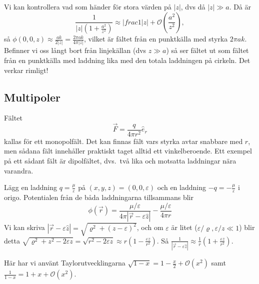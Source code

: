 \documentclass[%
oneside,                 %
final,                   %
10pt]{article}
\newenvironment{notice_mdfboxadmon}[1][]{
\begin{notice_mdfboxmdframed}[frametitle=#1]
}
{
\end{notice_mdfboxmdframed}
}
\newenvironment{warning_mdfboxadmon}[1][]{
\begin{warning_mdfboxmdframed}[frametitle=#1]
}
{
\end{warning_mdfboxmdframed}
}
\begin{document}
\begin{notice_mdfboxadmon}
Vi kan kontrollera vad som händer för stora värden på $|z|$, dvs då $|z| \gg a$. Då är 
\begin{equation}
\frac{1}{|z| \left( 1+\frac{a^2}{z^2} \right)} \approx |frac{1}{|z|} + \mathcal{O}\left(\frac{a^2}{z^2}\right),
\end{equation}
så $\phi(0,0,z)\approx \frac{a k}{2|z|} = \frac{2 \pi a k}{4\pi|z|}$, vilket är fältet från en punktkälla med styrka $2\pi a k$. Befinner vi oss långt bort från linjekällan (dvs $z \gg a$) så ser fältet ut som fältet från en punktkälla med laddning lika med den totala laddningen på cirkeln. Det verkar rimligt!
\end{notice_mdfboxadmon} %



\subsection*{Multipoler}

Fältet
\begin{equation}
  \vec{F} = \frac{q}{4 \pi r^2} \hat{e}_{r}
\end{equation}
kallas för ett monopolfält.  Det kan finnas fält vars styrka avtar snabbare med $r$, men sådana fält innehåller praktiskt taget alltid ett vinkelberoende. Ett exempel på ett sådant fält är dipolfältet, dvs.~två lika och motsatta laddningar nära varandra. 

Lägg en laddning $q = \frac{\mu}{\varepsilon}$ på $(x,y,z)=(0,0,\varepsilon)$ och en laddning
$-q = -\frac{\mu}{\varepsilon}$ i origo. Potentialen från de båda laddningarna tillsammans blir
\begin{equation}
\phi(\vec{r})=\frac{\mu/\varepsilon}{4\pi|\vec{r}-\varepsilon\hat z|}-\frac{\mu/\varepsilon}{4\pi r}
\end{equation}
Vi kan skriva $|\vec{r}-\varepsilon \hat z|=\sqrt{\varrho^2+(z-\varepsilon)^2}$, och om
$\varepsilon$ är litet ($\varepsilon/\varrho,\varepsilon/z \ll 1$) blir detta $\sqrt{\varrho^2+z^2-2\varepsilon
z}=\sqrt{r^2-2\varepsilon z}\approx r(1-\frac{\varepsilon z}{r^2})$. Så $\frac{1}{|\vec{r}-\varepsilon\hat z|}\approx \frac{1}{r}(1+\frac{\varepsilon z}{r^2})$.


\begin{warning_mdfboxadmon}[Kommentar]
Här har vi använt Taylorutvecklingarna $\sqrt{1-x} = 1 - \frac{x}{2} + \mathcal{O}(x^2)$ samt $\frac{1}{1-x} = 1 + x + \mathcal{O}(x^2)$.
\end{warning_mdfboxadmon} %
\end{document}
